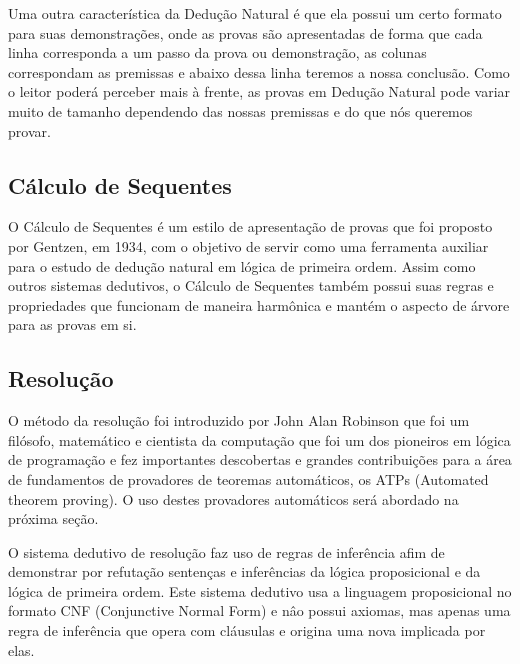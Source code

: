 

Uma outra característica da Dedução Natural é que ela possui um certo formato para suas demonstrações, onde as provas são apresentadas de forma que cada linha corresponda a um passo da prova ou demonstração, as colunas correspondam as premissas e abaixo dessa linha teremos a nossa conclusão.
Como o leitor poderá perceber mais à frente, as provas em Dedução Natural pode variar muito de tamanho dependendo das nossas premissas e do que nós queremos provar.

\subsection{Cálculo de Sequentes}

O Cálculo de Sequentes é um estilo de apresentação de provas que foi proposto por Gentzen, em 1934, com o objetivo de servir como uma ferramenta auxiliar para o estudo de dedução natural em lógica de primeira ordem.
Assim como outros sistemas dedutivos, o Cálculo de Sequentes também possui suas regras e propriedades que funcionam de maneira harmônica e mantém o aspecto de árvore para as provas em si.






\subsection{Resolução}

 O método da resolução foi introduzido por John Alan Robinson que foi um filósofo, matemático e cientista da computação que foi um dos pioneiros em lógica de programação e fez importantes descobertas e grandes contribuições para a área de fundamentos
de provadores de teoremas automáticos, os ATPs (Automated theorem proving).
O uso destes provadores automáticos será abordado na próxima seção.

 O sistema dedutivo de resolução faz uso de regras de inferência afim de demonstrar por refutação sentenças e inferências da lógica proposicional e da lógica de primeira ordem.
Este sistema dedutivo usa a linguagem proposicional no formato CNF (Conjunctive Normal Form) e nâo possui axiomas, mas apenas uma regra de inferência que opera com cláusulas e origina uma nova implicada por elas.


